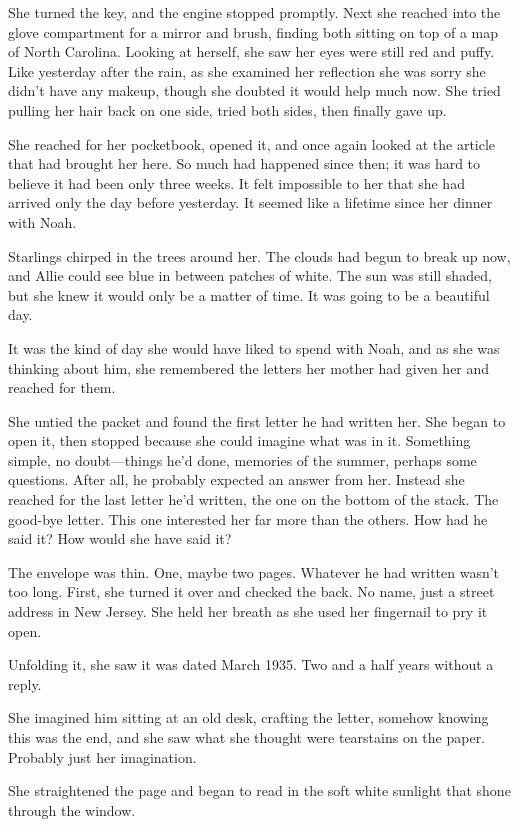 \documentclass[10pt, twoside, openright]{book}
\begin{document}
She turned the key, and the engine stopped promptly. Next she reached
into the glove compartment for a mirror and brush, finding both sitting
on top of a map of North Carolina. Looking at herself, she saw her eyes
were still red and puffy. Like yesterday after the rain, as she examined
her reflection she was sorry she didn't have any makeup, though she
doubted it would help much now. She tried pulling her hair back on one
side, tried both sides, then finally gave up.

She reached for her pocketbook, opened it, and once again looked at the
article that had brought her here. So much had happened since then; it
was hard to believe it had been only three weeks. It felt impossible to
her that she had arrived only the day before yesterday. It seemed like a
lifetime since her dinner with Noah.

Starlings chirped in the trees around her. The clouds had begun to break
up now, and Allie could see blue in between patches of white. The sun
was still shaded, but she knew it would only be a matter of time. It was
going to be a beautiful day.

It was the kind of day she would have liked to spend with Noah, and as
she was thinking about him, she remembered the letters her mother had
given her and reached for them.

She untied the packet and found the first letter he had written her. She
began to open it, then stopped because she could imagine what was in it.
Something simple, no doubt---things he'd done, memories of the summer,
perhaps some questions. After all, he probably expected an answer from
her. Instead she reached for the last letter he'd written, the one on
the bottom of the stack. The good-bye letter. This one interested her
far more than the others. How had he said it? How would she have said
it?

The envelope was thin. One, maybe two pages. Whatever he had written
wasn't too long. First, she turned it over and checked the back. No
name, just a street address in New Jersey. She held her breath as she
used her fingernail to pry it open.

Unfolding it, she saw it was dated March 1935. Two and a half years
without a reply.

She imagined him sitting at an old desk, crafting the letter, somehow
knowing this was the end, and she saw what she thought were tearstains
on the paper. Probably just her imagination.

She straightened the page and began to read in the soft white sunlight
that shone through the window.
\end{document}
